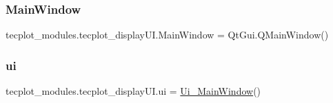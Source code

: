 \hypertarget{namespacetecplot__modules_1_1tecplot__display_u_i_a05b56eca3c779fabf41fa975030e6ca1}{}\label{namespacetecplot__modules_1_1tecplot__display_u_i_a05b56eca3c779fabf41fa975030e6ca1} 
\subsubsection{\texorpdfstring{Main\+Window}{MainWindow}}
{\footnotesize\ttfamily tecplot\+\_\+modules.\+tecplot\+\_\+display\+U\+I.\+Main\+Window = Qt\+Gui.\+Q\+Main\+Window()}

\hypertarget{namespacetecplot__modules_1_1tecplot__display_u_i_aa95df04768ef9b320020d0084673133a}{}\label{namespacetecplot__modules_1_1tecplot__display_u_i_aa95df04768ef9b320020d0084673133a} 
\subsubsection{\texorpdfstring{ui}{ui}}
{\footnotesize\ttfamily tecplot\+\_\+modules.\+tecplot\+\_\+display\+U\+I.\+ui = \hyperlink{classtecplot__modules_1_1tecplot__display_u_i_1_1_ui___main_window}{Ui\+\_\+\+Main\+Window}()}

